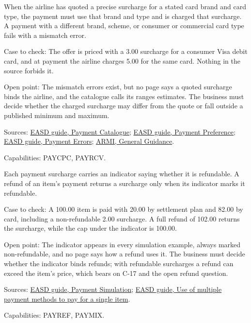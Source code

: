 \begin{theorem}
  \label{thm:payment-quoted-surcharge}
  \notready
  When the airline has quoted a precise surcharge for a stated card brand
  and card type, the payment must use that brand and type and is charged
  that surcharge. A payment with a different brand, scheme, or consumer or
  commercial card type fails with a mismatch error.

  Case to check: The offer is priced with a 3.00 surcharge for a consumer
  Visa debit card, and at payment the airline charges 5.00 for the same
  card. Nothing in the source forbids it.

  Open point: The mismatch errors exist, but no page says a quoted surcharge
  binds the airline, and the catalogue calls its ranges estimates. The
  business must decide whether the charged surcharge may differ from the
  quote or fall outside a published minimum and maximum.

  Sources: \href{https://standards.atlassian.net/wiki/spaces/EASD/pages/574488711/Payment+Catalogue}{EASD guide, Payment Catalogue};
  \href{https://standards.atlassian.net/wiki/spaces/EASD/pages/574685328/Payment+Preference}{EASD guide, Payment Preference};
  \href{https://standards.atlassian.net/wiki/spaces/EASD/pages/574587020/Payment+Errors}{EASD guide, Payment Errors};
  \href{https://standards.atlassian.net/wiki/spaces/ARMI/pages/584318980/General+Guidance}{ARMI, General Guidance}.

  Capabilities: PAYCPC, PAYRCV.
\end{theorem}

\begin{definition}
  \label{def:payment-surcharge-refundability}
  \notready
  Each payment surcharge carries an indicator saying whether it is
  refundable. A refund of an item's payment returns a surcharge only when
  its indicator marks it refundable.

  Case to check: A 100.00 item is paid with 20.00 by settlement plan and
  82.00 by card, including a non-refundable 2.00 surcharge. A full refund of
  102.00 returns the surcharge, while the cap under the indicator is 100.00.

  Open point: The indicator appears in every simulation example, always
  marked non-refundable, and no page says how a refund uses it. The business
  must decide whether the indicator binds refunds; with refundable
  surcharges a refund can exceed the item's price, which bears on C-17 and
  the open refund question.

  Sources: \href{https://standards.atlassian.net/wiki/spaces/EASD/pages/2593030164/Payment+Simulation}{EASD guide, Payment Simulation};
  \href{https://standards.atlassian.net/wiki/spaces/EASD/pages/2592899087/Use+of+multiple+payment+methods+to+pay+for+a+single+item}{EASD guide, Use of multiple payment methods to pay for a single item}.

  Capabilities: PAYREF, PAYMIX.
\end{definition}


